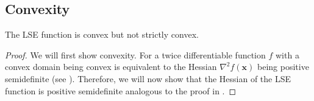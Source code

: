 \subsection{Convexity} \label{sec:LSE_convexity}

\begin{theorem} \label{thm:LSE_is_convex}
 The LSE function is convex but not strictly convex.
\end{theorem}

\begin{proof} 
 We will first show convexity.
 For a twice differentiable function \(f\) with a convex domain being convex is equivalent to the Hessian \(\nabla^2 f(\mathbf{x})\) being positive semidefinite
 (see \cite[p. 71]{BoydVandenberghe-ConvexOptimization}).
 Therefore, we will now show that the Hessian of the LSE function is positive semidefinite analogous to the proof in \cite[p. 74]{BoydVandenberghe-ConvexOptimization}.
 

\end{proof}
